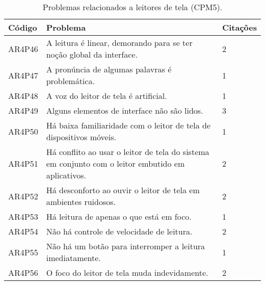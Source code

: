 \begin{table}[htb]
  \begin{center}
    \ABNTEXfontereduzida
    \caption{Problemas relacionados a leitores de tela (CPM5).}
    \label{tab-pro-lei-tel-1}
    \begin{tabular}{p{1.2cm}|p{12.0cm}|p{1.4cm}}
      \textbf{Código} & \textbf{Problema}                                                                                & \textbf{Citações} \\
      \hline
      AR4P46          & A leitura é linear, demorando para se ter noção global da interface.                              & 2                 \\
      \hline
      AR4P47          & A pronúncia de algumas palavras é problemática.                                                   & 1                 \\
      \hline
      AR4P48          & A voz do leitor de tela é artificial.                                                             & 1                 \\
      \hline
      AR4P49          & Alguns elementos de interface não são lidos.                                                      & 3                 \\
      \hline
      AR4P50          & Há baixa familiaridade com o leitor de tela de dispositivos móveis.                               & 1                 \\
      \hline
      AR4P51          & Há conflito ao usar o leitor de tela do sistema em conjunto com o leitor embutido em aplicativos. & 2                 \\
      \hline
      AR4P52          & Há desconforto ao ouvir o leitor de tela em ambientes ruidosos.                                   & 2                 \\
      \hline
      AR4P53          & Há leitura de apenas o que está em foco.                                                          & 1                 \\
      \hline
      AR4P54          & Não há controle de velocidade de leitura.                                                         & 2                 \\
      \hline
      AR4P55          & Não há um botão para interromper a leitura imediatamente.                                         & 1                 \\
      \hline
      AR4P56          & O foco do leitor de tela muda indevidamente.                                                      & 2                 \\

\end{tabular}
\end{center}
\end{table}
